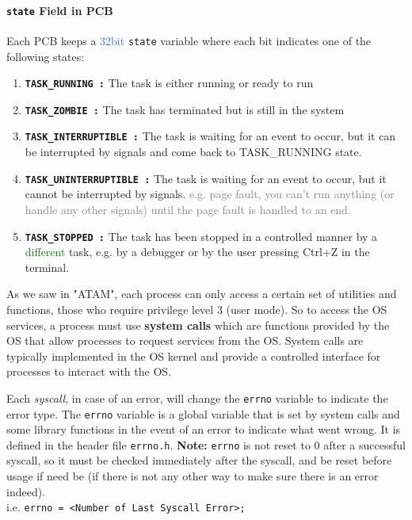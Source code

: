 \documentclass[openany,12pt]{book}
\newcommand{\code}[1]{\texttt{#1}}
\newcommand{\blue}[1]{\textcolor{RoyalBlue}{#1}}
\newcommand{\gray}[1]{\textcolor{gray}{#1}}
\newcommand{\green}[1]{\textcolor{Green}{#1}}
\begin{document}
\paragraph{\code{state} Field in PCB} Each PCB keeps a \blue{32bit} \code{state} variable where each bit indicates one of the following states:
\begin{enumerate}
  \item \code{\textbf{TASK\_RUNNING :}} The task is either running or ready to run

  \item \code{\textbf{TASK\_ZOMBIE :}} The task has terminated but is still in the system

  \item \code{\textbf{TASK\_INTERRUPTIBLE :}} The task is waiting for an event to occur, but it can be interrupted by signals and come back to TASK\_RUNNING state.

  \item \code{\textbf{TASK\_UNINTERRUPTIBLE :}} The task is waiting for an event to occur, but it cannot be interrupted by signals. \gray{e.g. page fault, you can't run anything (or handle any other signals) until the page fault is handled to an end.}

  \item \code{\textbf{TASK\_STOPPED :}} The task has been stopped in a controlled manner by a \green{different} task, e.g. by a debugger or by the user pressing Ctrl+Z in the terminal.
\end{enumerate}


As we saw in "ATAM", each process can only access a certain set of utilities and functions, those who require privilege level 3 (user mode). So to access the OS services, a process must use \textbf{system calls} which are functions provided by the OS that allow processes to request services from the OS. System calls are typically implemented in the OS kernel and provide a controlled interface for processes to interact with the OS.

\vspace{1em}

Each \textit{syscall}, in case of an error, will change the \texttt{errno} variable to indicate the error type. The \texttt{errno} variable is a global variable that is set by system calls and some library functions in the event of an error to indicate what went wrong. It is defined in the header file \texttt{errno.h}. {\color{blue}\textbf{Note:} \texttt{errno} is not reset to 0 after a successful syscall, so it must be checked immediately after the syscall, and be reset before usage if need be} (if there is not any other way to make sure there is an error indeed).\\
i.e. \code{errno = <Number of Last Syscall Error>;}
\end{document}
